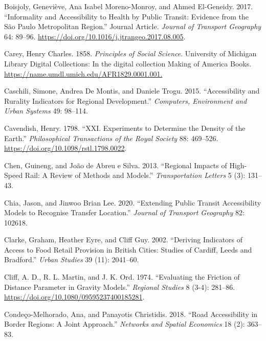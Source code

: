 \documentclass[
]{article}
\newlength{\cslhangindent}
\newenvironment{CSLReferences}[2] %
 {\begin{list}{}{%
  \setlength{\itemindent}{0pt}
  \setlength{\leftmargin}{0pt}
  \setlength{\parsep}{0pt}
  \ifodd #1
   \setlength{\leftmargin}{\cslhangindent}
   \setlength{\itemindent}{-1\cslhangindent}
  \fi
  \setlength{\itemsep}{#2\baselineskip}}}
 {\end{list}}
\begin{document}
\begin{CSLReferences}{1}{0}
Boisjoly, Geneviève, Ana Isabel Moreno-Monroy, and Ahmed El-Geneidy.
2017. {``Informality and Accessibility to Health by Public Transit:
Evidence from the São Paulo Metropolitan Region.''} Journal Article.
\emph{Journal of Transport Geography} 64: 89--96.
\url{https://doi.org/10.1016/j.jtrangeo.2017.08.005}.

Carey, Henry Charles. 1858. \emph{Principles of Social Science}.
University of Michigan Library Digital Collections: In the digital
collection Making of America Books.
\url{https://name.umdl.umich.edu/AFR1829.0001.001.}

Caschili, Simone, Andrea De Montis, and Daniele Trogu. 2015.
{``Accessibility and Rurality Indicators for Regional Development.''}
\emph{Computers, Environment and Urban Systems} 49: 98--114.

Cavendish, Henry. 1798. {``{XXI}. {Experiments} to Determine the Density
of the Earth.''} \emph{Philosophical Transactions of the Royal Society}
88: 469--526. \url{https://doi.org/10.1098/rstl.1798.0022}.

Chen, Guineng, and João de Abreu e Silva. 2013. {``Regional Impacts of
High-Speed Rail: A Review of Methods and Models.''} \emph{Transportation
Letters} 5 (3): 131--43.

Chia, Jason, and Jinwoo Brian Lee. 2020. {``Extending Public Transit
Accessibility Models to Recognise Transfer Location.''} \emph{Journal of
Transport Geography} 82: 102618.

Clarke, Graham, Heather Eyre, and Cliff Guy. 2002. {``Deriving
Indicators of Access to Food Retail Provision in British Cities: Studies
of Cardiff, Leeds and Bradford.''} \emph{Urban Studies} 39 (11):
2041--60.

Cliff, A. D., R. L. Martin, and J. K. Ord. 1974. {``Evaluating the
Friction of Distance Parameter in Gravity Models.''} \emph{Regional
Studies} 8 (3-4): 281--86.
\url{https://doi.org/10.1080/09595237400185281}.

Condeço-Melhorado, Ana, and Panayotis Christidis. 2018. {``Road
Accessibility in Border Regions: A Joint Approach.''} \emph{Networks and
Spatial Economics} 18 (2): 363--83.


\end{CSLReferences}
\end{document}
